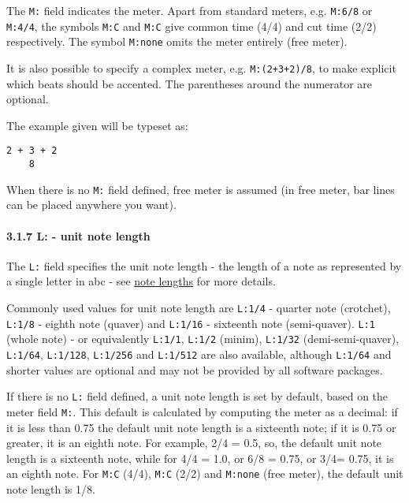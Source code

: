 The \texttt{M:} field indicates the meter. Apart from standard meters,
e.g. \texttt{M:6/8} or \texttt{M:4/4}, the symbols \texttt{M:C} and
\texttt{M:C\textbar{}} give common time (4/4) and cut time (2/2)
respectively. The symbol \texttt{M:none} omits the meter entirely (free
meter).

It is also possible to specify a complex meter, e.g.
\texttt{M:(2+3+2)/8}, to make explicit which beats should be accented.
The parentheses around the numerator are optional.

The example given will be typeset as:

\begin{verbatim}
2 + 3 + 2
    8
\end{verbatim}

When there is no \texttt{M:} field defined, free meter is assumed (in
free meter, bar lines can be placed anywhere you want).

\hypertarget{lunit_note_length}{\paragraph{3.1.7 L: - unit note
length}\label{lunit_note_length}}

The \texttt{L:} field specifies the unit note length - the length of a
note as represented by a single letter in abc - see
\protect\hyperlink{note_lengths}{note lengths} for more details.

Commonly used values for unit note length are \texttt{L:1/4} - quarter
note (crotchet), \texttt{L:1/8} - eighth note (quaver) and
\texttt{L:1/16} - sixteenth note (semi-quaver). \texttt{L:1} (whole
note) - or equivalently \texttt{L:1/1}, \texttt{L:1/2} (minim),
\texttt{L:1/32} (demi-semi-quaver), \texttt{L:1/64}, \texttt{L:1/128},
\texttt{L:1/256} and \texttt{L:1/512} are also available, although
\texttt{L:1/64} and shorter values are optional and may not be provided
by all software packages.

If there is no \texttt{L:} field defined, a unit note length is set by
default, based on the meter field \texttt{M:}. This default is
calculated by computing the meter as a decimal: if it is less than 0.75
the default unit note length is a sixteenth note; if it is 0.75 or
greater, it is an eighth note. For example, 2/4 = 0.5, so, the default
unit note length is a sixteenth note, while for 4/4 = 1.0, or 6/8 =
0.75, or 3/4= 0.75, it is an eighth note. For \texttt{M:C} (4/4),
\texttt{M:C\textbar{}} (2/2) and \texttt{M:none} (free meter), the
default unit note length is 1/8.

